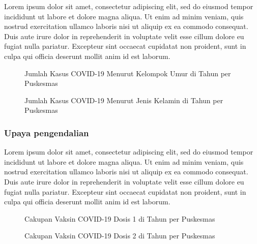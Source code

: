 Lorem ipsum dolor sit amet, consectetur adipiscing elit, sed do eiusmod tempor incididunt ut labore et dolore magna aliqua. Ut enim ad minim veniam, quis nostrud exercitation ullamco laboris nisi ut aliquip ex ea commodo consequat. Duis aute irure dolor in reprehenderit in voluptate velit esse cillum dolore eu fugiat nulla pariatur. Excepteur sint occaecat cupidatat non proident, sunt in culpa qui officia deserunt mollit anim id est laborum.

\begin{figure}[H]
	\centering
	\caption{Jumlah Kasus COVID-19 Menurut Kelompok Umur di \namaKabupaten Tahun \tP per Puskesmas}
	\label{fig:COVID-per-umur}
\end{figure}

\begin{figure}[H]
	\centering
	\caption{Jumlah Kasus COVID-19 Menurut Jenis Kelamin di \namaKabupaten Tahun \tP per Puskesmas}
	\label{fig:COVID-per-JK}
\end{figure}

\subsubsection{Upaya pengendalian}
Lorem ipsum dolor sit amet, consectetur adipiscing elit, sed do eiusmod tempor incididunt ut labore et dolore magna aliqua. Ut enim ad minim veniam, quis nostrud exercitation ullamco laboris nisi ut aliquip ex ea commodo consequat. Duis aute irure dolor in reprehenderit in voluptate velit esse cillum dolore eu fugiat nulla pariatur. Excepteur sint occaecat cupidatat non proident, sunt in culpa qui officia deserunt mollit anim id est laborum.

\begin{figure}[H]
	\centering
	\caption{Cakupan Vaksin COVID-19 Dosis 1 di \namaKabupaten Tahun \tP per Puskesmas}
	\label{fig:vaksin-COVID-dosis-1}
\end{figure}

\begin{figure}[H]
	\centering
	\caption{Cakupan Vaksin COVID-19 Dosis 2 di \namaKabupaten Tahun \tP per Puskesmas}
	\label{fig:vaksin-COVID-dosis-2}
\end{figure}